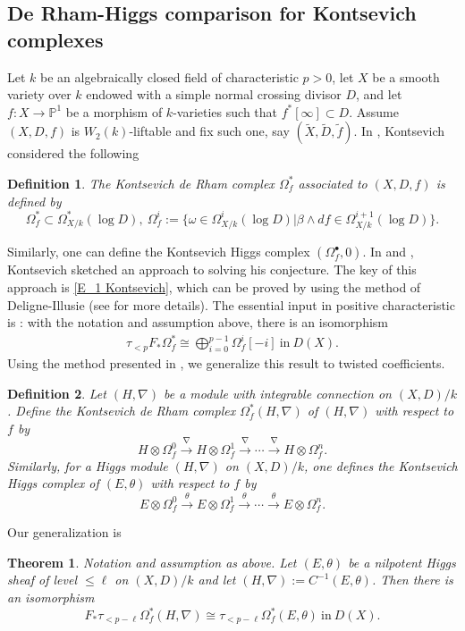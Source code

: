 \documentclass[12pt, a4paper]{article}
\newtheorem{definition}{Definition}[section]
\newtheorem{theorem}{Theorem}[section]
\begin{document}
\subsection{De Rham-Higgs comparison for Kontsevich complexes}
Let $k$ be an algebraically closed field of characteristic $p>0$, let $X$ be a smooth variety over $k$ endowed with a simple normal crossing divisor $D$, and let $f:X\to\mathbb P^1$ be a morphism of $k$-varieties such that $f^*[\infty]\subset D$. Assume $(X,D,f)$ is $W_2(k)$-liftable and fix such one, say $(\tilde X,\tilde D,\tilde f)$. In \cite{Kon1}, Kontsevich considered the following 
\begin{definition}
The Kontsevich de Rham complex $\Omega^*_f$ associated to $(X,D,f)$ is defined by 
$$
\Omega^*_f\subset\Omega^*_{X/k}(\log D),~\Omega^i_f:=\{\omega\in\Omega^i_{X/k}(\log D)|\beta\wedge df\in\Omega^{i+1}_{X/k}(\log D)\}.
$$
\end{definition}
Similarly, one can define the Kontsevich Higgs complex $(\Omega_f^\bullet,0)$. In \cite{Kon1} and \cite{Kon2}, Kontsevich sketched an approach to solving his conjecture.  The key of this approach is \eqref{E_1 Kontsevich}, which can be proved by using the method of Deligne-Illusie \cite{DI} (see \cite[Appendix D]{ESY} for more details). The essential input in positive characteristic is \cite[Proposition D.1.5]{ESY}: with the notation and assumption above,
there is an isomorphism 
\begin{eqnarray}\label{ESY decomposition}
\tau_{<p}F_*\Omega_f^*\cong\bigoplus_{i=0}^{p-1}\Omega_f^i[-i]~\mathrm{in}~D(X).
\end{eqnarray}
Using the method presented in \cite{SZ2}, we generalize this result to twisted coefficients.
\begin{definition}
Let $(H,\nabla)$ be a module with integrable connection on $(X,D)/k$. Define the Kontsevich de Rham complex $\Omega_f^*(H,\nabla)$ of $(H,\nabla)$ with respect to $f$ by 
$$
H\otimes\Omega^0_f\xrightarrow{\nabla}H\otimes\Omega^1_f\xrightarrow{\nabla}\cdots\xrightarrow{\nabla}H\otimes\Omega_f^n.
$$
Similarly, for a Higgs module $(H,\nabla)$ on $(X,D)/k$, one defines the Kontsevich Higgs complex of $(E,\theta)$ with respect to $f$ by
$$
E\otimes\Omega^0_f\xrightarrow{\theta}E\otimes\Omega^1_f\xrightarrow{\theta}\cdots\xrightarrow{\theta}E\otimes\Omega_f^n.
$$
\end{definition}
Our generalization is
\begin{theorem}\label{Kontsevich de Rham-Higgs intro}
Notation and assumption as above. Let $(E,\theta)$ be a nilpotent Higgs sheaf of level $\leq\ell$ on $(X,D)/k$ and let $(H,\nabla):=C^{-1}(E,\theta)$. Then there is an isomorphism
$$
F_*\tau_{<p-\ell}\Omega_f^*(H,\nabla)\cong\tau_{<p-\ell}\Omega_f^*(E,\theta)~\mathrm{in}~D(X).
$$
\end{theorem}
\end{document}
